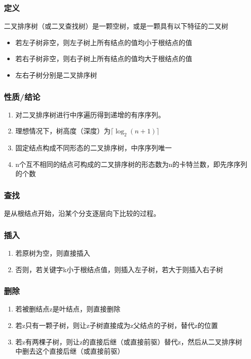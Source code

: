 \subsubsection{定义}
二叉排序树（或二叉查找树）是一颗空树，或是一颗具有以下特征的二叉树
\begin{itemize}
    \item 若左子树非空，则左子树上所有结点的值均小于根结点的值
    \item 若右子树非空，则右子树上所有结点的值均大于根结点的值
    \item 左右子树分别是二叉排序树
\end{itemize}


\subsubsection{性质/结论}
\begin{enumerate}
    \item 对二叉排序树进行中序遍历得到递增的有序序列。
    \item 理想情况下，树高度（深度）为\(\lceil\log_2(n + 1)\rceil\)
    \item 固定结点构成不同形态的二叉排序树，中序序列唯一
    \item n个互不相同的结点可构成的二叉排序树的形态数为n的卡特兰数，即先序序列的个数
\end{enumerate}


\subsubsection{查找}
是从根结点开始，沿某个分支逐层向下比较的过程。


\subsubsection{插入}
\begin{enumerate}
    \item 若原树为空，则直接插入
    \item 否则，若关键字k小于根结点值，则插入左子树，若大于则插入右子树
\end{enumerate}

\subsubsection{删除}
\begin{enumerate}
    \item 若被删结点z是叶结点，则直接删除
    \item 若z只有一颗子树，则让z子树直接成为z父结点的子树，替代z的位置
    \item 若z有两棵子树，则让z的直接后继（或直接前驱）替代z，然后从二叉排序树中删去这个直接后继（或直接前驱）
\end{enumerate}

